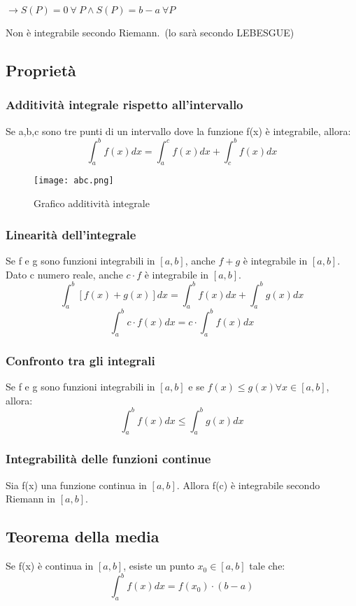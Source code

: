 \documentclass[../main.tex]{subfiles}
\begin{document}
$\rightarrow S(P) = 0 \ \forall \ P \land S(P) = b-a \ \forall P$

Non è integrabile secondo Riemann.\ (lo sarà secondo LEBESGUE)

\newpage
\subsection{Proprietà}
\subsubsection{Additività integrale rispetto all'intervallo}
Se a,b,c sono tre punti di un intervallo dove la funzione f(x) è integrabile,
allora:\[\int_a^b f(x)dx = \int_a^c f(x)dx + \int_c^b f(x)dx\]

\begin{figure}[ht]
    \centering
    \texttt{[image: abc.png]}
    \caption{Grafico additività integrale}\label{fig:additivita-integrale}
\end{figure}

\subsubsection{Linearità dell'integrale}
Se f e g sono funzioni integrabili in $[a, b]$, anche $f+g$ è integrabile in
$[a, b]$. Dato c numero reale, anche $c\cdot f$ è integrabile in $[a, b]$.
\[\int_a^b [f(x)+g(x)]dx = \int_a^b f(x)dx + \int_a^b g(x)dx\]\[\int_a^b
    c\cdot f(x)dx = c\cdot\int_a^b f(x)dx\]

\subsubsection{Confronto tra gli integrali}
Se f e g sono funzioni integrabili in $[a, b]$ e se $f(x) \leq g(x) \forall x
    \in [a, b]$, allora:\[\int_a^b f(x)dx \leq \int_a^b g(x)dx\]

\subsubsection{Integrabilità delle funzioni continue}
Sia f(x) una funzione continua in $[a, b]$. Allora f(c) è integrabile secondo
Riemann in $[a, b]$.

\subsection{Teorema della media}
Se f(x) è continua in $[a, b]$, esiste un punto $x_0 \in [a, b]$ tale che:
\[\int_a^b f(x)dx = f(x_0)\cdot(b-a)\]
\end{document}
